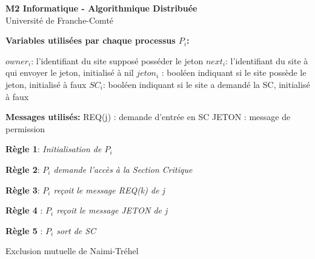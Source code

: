 \documentclass{article}
\begin{document}
\begin{titlepage}
  
  \vspace*{-15ex}
  \begin{center}
    {\Large\bf M2 Informatique - Algorithmique Distribuée}\\
    Université de Franche-Comté
  \end{center}
  \vspace{1ex}

  \begin{small}
  \begin{algorithm}[H]
    \DontPrintSemicolon
    \BlankLine
    \textbf{Variables utilisées par chaque processus $P_{i}$:}\;

      \quad $owner_i$: l'identifiant du site supposé posséder le jeton\;
      \quad $next_i$: l'identifiant du site à qui envoyer le jeton,
      initialisé à nil \;
      \quad $jeton_i$ : booléen indiquant si le site possède le jeton,
      initialisé à faux \;
      \quad $SC_i$: booléen indiquant si le site a demandé la SC,
      initialisé à faux\;

    \BlankLine
    
    \textbf{Messages utilisés:}\;
    \quad REQ(j) : demande d'entrée en SC\;
    \quad JETON : message de permission \;
    \BlankLine
    
    {\bf Règle 1}: {\it Initialisation de $P_i$}\;
    \BlankLine
    
    {\bf Règle 2}: {\it $P_i$ demande l'accès à la Section Critique}\;
    \BlankLine
    
    {\bf Règle 3}: {\it $P_i$ reçoit le message REQ(k) de j}\;
    \BlankLine
    
    \textbf{Règle 4} : {\it $P_i$ reçoit le message JETON de j}\;
    
    \textbf{Règle 5} : {\it $P_i$ sort de SC}\;
    \caption{Exclusion mutuelle de Naimi-Tréhel}
  \end{algorithm}
  \end{small}
\end{titlepage}
\end{document}
